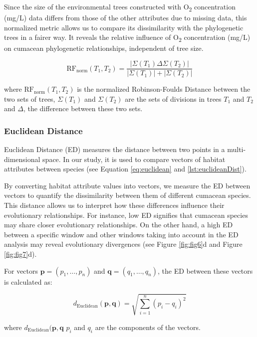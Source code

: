 Since the size of the environmental trees constructed with O\textsubscript{2} concentration (mg/L) data differs from those of the other attributes due to missing data, this normalized metric allows us to compare its dissimilarity with the phylogenetic trees in a fairer way. It reveals the relative influence of O\textsubscript{2} concentration (mg/L) on cumacean phylogenetic relationships, independent of tree size.

\begin{equation}\label{eq:rf_norm}
    \text{RF}_{\text{norm}}(T_1, T_2) = \frac{| \Sigma(T_1) \Delta \Sigma(T_2) |}{| \Sigma(T_1) | + | \Sigma(T_2) |}
\end{equation}

where $ \text{RF}_{\text{norm}}(T_1, T_2)$ is the normalized Robinson-Foulds Distance between the two sets of trees, $\Sigma(T_1)$ and $\Sigma(T_2)$ are the sets of divisions in trees $T_1$ and $T_2$ and $ \Delta $, the difference between these two sets.

\subsubsection{Euclidean Distance}\label{euclidean}
Euclidean Distance (ED) measures the distance between two points in a multi-dimensional space. In our study, it is used to compare vectors of habitat attributes between species (see Equation \eqref{eq:euclidean} and \autoref{lst:euclideanDist}).

By converting habitat attribute values into vectors, we measure the ED between vectors to quantify the dissimilarity between them of different cumacean species. This distance allows us to interpret how these differences influence their evolutionary relationships. For instance, low ED signifies that cumacean species may share closer evolutionary relationships. On the other hand, a high ED between a specific window and other windows taking into account in the ED analysis may reveal evolutionary divergences (see Figure \ref{fig:fig6}d and Figure \ref{fig:fig7}d).

For vectors $\mathbf{p} = (p_1, \ldots, p_n)$ and $\mathbf{q} = (q_1, \ldots, q_n)$, the ED between these vectors is calculated as:

\begin{equation}\label{eq:euclidean}
    d_{\text{Euclidean}}(\mathbf{p}, \mathbf{q}) = \sqrt{\sum_{i=1}^{n} (p_i - q_i)^2}
\end{equation}

where $d_{\text{Euclidean}}(\mathbf{p}, \mathbf{q}$ $p_i$ and $q_i$ are the components of the vectors.

